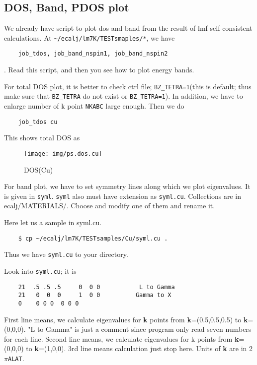 \documentclass[a4paper,10pt,epsf,fleqn]{article}
\begin{document}
\subsection{DOS, Band, PDOS plot}

We already have script to plot dos and band from the result of lmf
self-consistent calculations.
At \verb+~/ecalj/lm7K/TESTsmaples/*+, we have
\begin{verbatim}
    job_tdos, job_band_nspin1, job_band_nspin2
\end{verbatim}
. Read this script, and then you see how to plot energy bands.

For total DOS plot, it is better to check ctrl file;
\verb+BZ_TETRA=1+(this is default; thus make sure that \verb+BZ_TETRA+ do
not exist or \verb+BZ_TETRA=1+). 
In addition, we have to enlarge number of k point \verb+NKABC+ large enough.
Then we do
\begin{verbatim}
    job_tdos cu
\end{verbatim}
This shows total DOS as
\begin{figure}[h]
 \begin{center}
  \texttt{[image: img/ps.dos.cu]}
  \vspace{5mm}
  \caption{DOS(Cu)}
 \end{center}
\end{figure}
 

For band plot, we have to set symmetry lines along which we plot eigenvalues.
It is given in \verb+syml+. \verb+syml+ also must have extension
as \verb+syml.cu+. Collections are in ecalj/MATERIALS/. Choose and
modify one of them and rename it.

Here let us a sample in syml.cu.
\begin{verbatim}
    $ cp ~/ecalj/lm7K/TESTsamples/Cu/syml.cu .
\end{verbatim}
Thus we have \verb+syml.cu+ to your directory.

Look into \verb+syml.cu+; it is
\begin{verbatim}
    21  .5 .5 .5     0  0 0           L to Gamma
    21   0  0  0     1  0 0          Gamma to X
    0    0 0 0  0 0 0
\end{verbatim}
First line means, we calculate eigenvalues 
for {\bf k} points from {\bf k}=(0.5,0.5,0.5) to {\bf k}=(0,0,0).
"L to Gamma" is just a comment since program only read 
seven numbers for each line.
Second line means, we calculate eigenvalues 
for k points from {\bf k}=(0,0,0) to {\bf k}=(1,0,0).
3rd line means calculation just stop here.
Units of {\bf k} are in 2$\pi$\verb+ALAT+.
\end{document}
